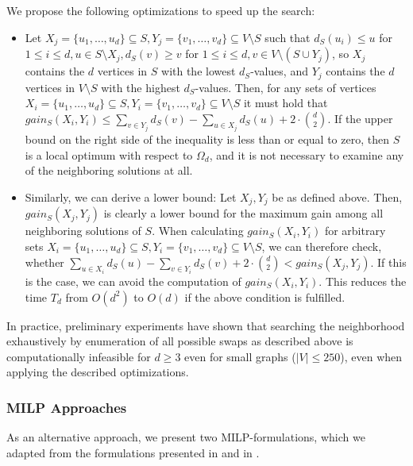 \documentclass[draft,final]{vutinfth} %
\begin{document}
We propose the following optimizations to speed up the search: 
\begin{itemize}
    \item Let $X_j = \{u_1, \dots, u_d\} \subseteq S, Y_j = \{v_1, \dots, v_d\} \subseteq V \setminus S$ such that $d_S(u_i) \leq u$ for $1 \leq i \leq d, u \in S \setminus X_j, d_S(v) \geq v$ for $1 \leq i \leq d, v \in V \setminus (S \cup Y_j)$, so $X_j$ contains the $d$ vertices in $S$ with the lowest $d_S$-values, and $Y_j$ contains the $d$ vertices in $V\setminus S$ with the highest $d_S$-values.  
    Then, for any sets of vertices $X_i = \{u_1, \dots, u_d\} \subseteq S, Y_i = \{v_1, \dots, v_d\} \subseteq V \setminus S$ it must hold that $\mathit{gain_S}(X_i, Y_i) \leq \sum_{v \in Y_j} d_S(v) - \sum_{u \in X_j} d_S(u) + 2 \cdot \binom{d}{2}$. If the upper bound on the right side of the inequality is less than or equal to zero, then $S$ is a local optimum with respect to $\Omega_d$, and it is not necessary to examine any of the neighboring solutions at all. 
    \item Similarly, we can derive a lower bound: Let $X_j, Y_j$ be as defined above. Then, $\mathit{gain_S}(X_j, Y_j)$ is clearly a lower bound for the maximum gain among all neighboring solutions of $S$. When calculating $\mathit{gain_S}(X_i, Y_i)$ for arbitrary sets $X_i = \{u_1, \dots, u_d\} \subseteq S, Y_i = \{v_1, \dots, v_d\} \subseteq V \setminus S$, we can therefore check, whether $\sum_{u \in X_i} d_S(u) - \sum_{v \in Y_i} d_S(v) + 2 \cdot \binom{d}{2} < \mathit{gain_S}(X_j, Y_j)$. If this is the case, we can avoid the computation of $\mathit{gain_S}(X_i, Y_i)$. This reduces the time $T_d$ from $O(d^2)$ to $O(d)$ if the above condition is fulfilled. 
\end{itemize}

In practice, preliminary experiments have shown that searching the neighborhood exhaustively by enumeration of all possible swaps as described above is computationally infeasible for $d \geq 3$ even for small graphs ($|V| \leq 250$), even when applying the described optimizations. 

\subsubsection{MILP Approaches}

As an alternative approach, we present two MILP-formulations, which we adapted from the formulations presented in \cite{pattillo_maximum_2013} and in \cite{VeremyevPBP16}.
 
\end{document}
